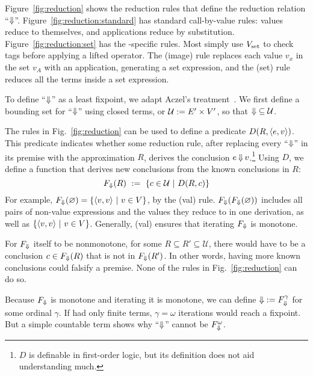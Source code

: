 
Figure~\ref{fig:reduction} shows the reduction rules that define the reduction relation ``$\operatorname{\Downarrow}$''. Figure~\ref{fig:reduction:standard} has standard call-by-value rules: values reduce to themselves, and applications reduce by substitution.
Figure~\ref{fig:reduction:set} has the \targetlang-specific rules. Most simply use $V_\mathrm{set}$ to check tags before applying a lifted operator.
The (image) rule replaces each value $v_x$ in the set $v_A$ with an application, generating a set expression, and the (set) rule reduces all the terms inside a set expression.

\newcommand{\Univ}{\mathcal{U}}

To define ``$\operatorname{\Downarrow}$'' as a least fixpoint, we adapt Aczel's treatment~\cite{cit:aczel-1977-inductive}. We first define a bounding set for ``$\operatorname{\Downarrow}$'' using closed terms, or $\Univ \metadef E' \times V'$, so that $\dto \subseteq \Univ$.

The rules in Fig.~\ref{fig:reduction} can be used to define a predicate $D(R,\langle{e,v}\rangle)$. This predicate indicates whether some reduction rule, after replacing every ``$\operatorname{\Downarrow}$'' in its premise with the approximation $R$, derives the conclusion $e \operatorname{\Downarrow} v$.\footnote{$D$ is definable in first-order logic, but its definition does not aid understanding much.}
Using $D$, we define a function that derives new conclusions from the known conclusions in $R$:
\begin{equation}
	F_{\dto}(R)\ \metadef\ \setb{c \in \Univ}{D(R,c)}
\end{equation}
For example, $F_{\operatorname{\Downarrow}}(\varnothing) = \lbrace {\langle{v,v}\rangle} \ \lvert\ {v \in V} \rbrace$, by the (val) rule. $F_{\operatorname{\Downarrow}}(F_{\operatorname{\Downarrow}}(\varnothing))$ includes all pairs of non-value expressions and the values they reduce to in one derivation, as well as $\lbrace {\langle{v,v}\rangle} \ \lvert\ {v \in V} \rbrace$. Generally, (val) ensures that iterating $F_{\operatorname{\Downarrow}}$ is monotone.

For $F_{\operatorname{\Downarrow}}$ itself to be nonmonotone, for some $R \subseteq R' \subseteq \Univ$, there would have to be a conclusion $c \in F_{\operatorname{\Downarrow}}(R)$ that is not in $F_{\operatorname{\Downarrow}}(R')$. In other words, having more known conclusions could falsify a premise. None of the rules in Fig.~\ref{fig:reduction} can do so.

Because $F_{\operatorname{\Downarrow}}$ is monotone and iterating it is monotone, we can define $\operatorname{\Downarrow} := F_{\operatorname{\Downarrow}}^\gamma$ for some ordinal $\gamma$. If \targetlang had only finite terms, $\gamma = \omega$ iterations would reach a fixpoint. But a simple countable term shows why ``$\operatorname{\Downarrow}$'' cannot be $F_{\operatorname{\Downarrow}}^\omega$.

